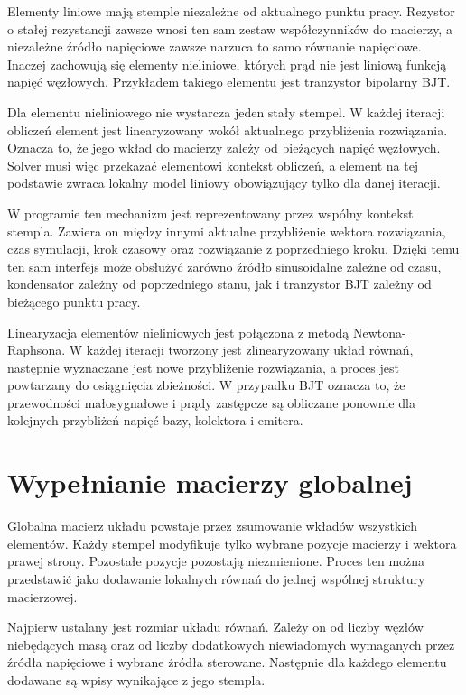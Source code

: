 Elementy liniowe mają stemple niezależne od aktualnego punktu pracy. Rezystor o stałej rezystancji zawsze wnosi ten sam zestaw współczynników do macierzy, a niezależne źródło napięciowe zawsze narzuca to samo równanie napięciowe. Inaczej zachowują się elementy nieliniowe, których prąd nie jest liniową funkcją napięć węzłowych. Przykładem takiego elementu jest tranzystor bipolarny BJT.

Dla elementu nieliniowego nie wystarcza jeden stały stempel. W każdej iteracji obliczeń element jest linearyzowany wokół aktualnego przybliżenia rozwiązania. Oznacza to, że jego wkład do macierzy zależy od bieżących napięć węzłowych. Solver musi więc przekazać elementowi kontekst obliczeń, a element na tej podstawie zwraca lokalny model liniowy obowiązujący tylko dla danej iteracji.

W programie ten mechanizm jest reprezentowany przez wspólny kontekst stempla. Zawiera on między innymi aktualne przybliżenie wektora rozwiązania, czas symulacji, krok czasowy oraz rozwiązanie z poprzedniego kroku. Dzięki temu ten sam interfejs może obsłużyć zarówno źródło sinusoidalne zależne od czasu, kondensator zależny od poprzedniego stanu, jak i tranzystor BJT zależny od bieżącego punktu pracy.

Linearyzacja elementów nieliniowych jest połączona z metodą Newtona-Raphsona. W każdej iteracji tworzony jest zlinearyzowany układ równań, następnie wyznaczane jest nowe przybliżenie rozwiązania, a proces jest powtarzany do osiągnięcia zbieżności. W przypadku BJT oznacza to, że przewodności małosygnałowe i prądy zastępcze są obliczane ponownie dla kolejnych przybliżeń napięć bazy, kolektora i emitera.

\section{Wypełnianie macierzy globalnej}
\label{sec:wypelnianie-macierzy-globalnej}

Globalna macierz układu powstaje przez zsumowanie wkładów wszystkich elementów. Każdy stempel modyfikuje tylko wybrane pozycje macierzy i wektora prawej strony. Pozostałe pozycje pozostają niezmienione. Proces ten można przedstawić jako dodawanie lokalnych równań do jednej wspólnej struktury macierzowej.

Najpierw ustalany jest rozmiar układu równań. Zależy on od liczby węzłów niebędących masą oraz od liczby dodatkowych niewiadomych wymaganych przez źródła napięciowe i wybrane źródła sterowane. Następnie dla każdego elementu dodawane są wpisy wynikające z jego stempla.

